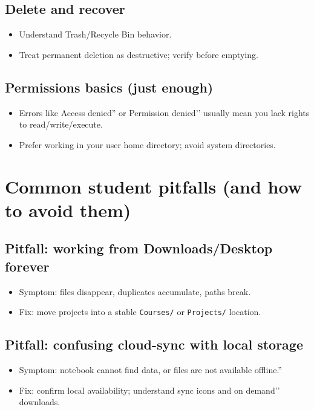\subsection{Delete and recover}
\begin{itemize}
\item Understand Trash/Recycle Bin behavior.
\item Treat permanent deletion as destructive; verify before emptying.
\end{itemize}

\subsection{Permissions basics (just enough)}
\begin{itemize}
\item Errors like Access denied'' or Permission denied’’ usually mean you lack rights to read/write/execute.
\item Prefer working in your user home directory; avoid system directories.
\end{itemize}

\section{Common student pitfalls (and how to avoid them)}
\subsection{Pitfall: working from Downloads/Desktop forever}
\begin{itemize}
\item Symptom: files disappear, duplicates accumulate, paths break.
\item Fix: move projects into a stable \texttt{Courses/} or \texttt{Projects/} location.
\end{itemize}

\subsection{Pitfall: confusing cloud-sync with local storage}
\begin{itemize}
\item Symptom: notebook cannot find data, or files are not available offline.'' \item Fix: confirm local availability; understand sync icons and on demand’’ downloads.
\end{itemize}

